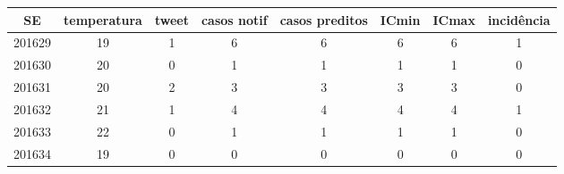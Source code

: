 \begin{tabular}{c|ccccccc}
  \hline
SE & temperatura & tweet & casos notif & casos preditos & ICmin & ICmax & incidência \\ 
  \hline
201629 & 19 & 1 & 6 & 6 & 6 & 6 & 1 \\ 
  201630 & 20 & 0 & 1 & 1 & 1 & 1 & 0 \\ 
  201631 & 20 & 2 & 3 & 3 & 3 & 3 & 0 \\ 
  201632 & 21 & 1 & 4 & 4 & 4 & 4 & 1 \\ 
  201633 & 22 & 0 & 1 & 1 & 1 & 1 & 0 \\ 
  201634 & 19 & 0 & 0 & 0 & 0 & 0 & 0 \\ 
   \hline
\end{tabular}
